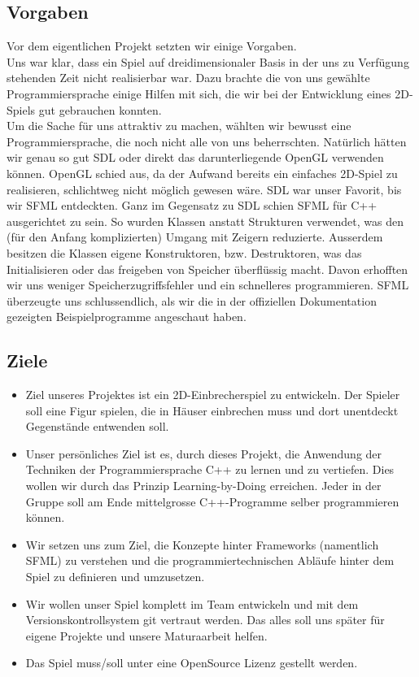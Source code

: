 \documentclass[12pt,a4paper]{scrartcl}
\begin{document}
\subsection{Vorgaben}

Vor dem eigentlichen Projekt setzten wir einige Vorgaben.
\\
Uns war klar, dass ein Spiel auf dreidimensionaler Basis in der uns zu Verfügung stehenden Zeit nicht realisierbar war.
Dazu brachte die von uns gewählte Programmiersprache einige Hilfen mit sich, die wir bei der Entwicklung eines 2D-Spiels gut gebrauchen konnten.
\\
Um die Sache für uns attraktiv zu machen,
wählten wir bewusst eine Programmiersprache, die noch nicht
alle von uns beherrschten. Natürlich hätten wir genau so gut
SDL oder direkt das darunterliegende OpenGL verwenden können. OpenGL
schied aus, da der Aufwand bereits ein einfaches 2D-Spiel zu realisieren,
schlichtweg nicht möglich gewesen wäre. SDL war unser Favorit, bis wir
SFML entdeckten. Ganz im Gegensatz zu SDL schien SFML für C++ ausgerichtet
zu sein. So wurden Klassen anstatt Strukturen verwendet, was den (für den
Anfang komplizierten) Umgang mit Zeigern reduzierte. Ausserdem besitzen die
Klassen eigene Konstruktoren, bzw. Destruktoren, was das Initialisieren
oder das freigeben von Speicher überflüssig macht. Davon erhofften wir uns
weniger Speicherzugriffsfehler und ein schnelleres programmieren. SFML
überzeugte uns schlussendlich, als wir die in der offiziellen Dokumentation
gezeigten Beispielprogramme angeschaut haben.

\subsection{Ziele}
\begin{itemize}
\item 
Ziel unseres Projektes ist ein 2D-Einbrecherspiel zu entwickeln. Der Spieler soll eine Figur spielen, die in Häuser einbrechen muss und dort unentdeckt Gegenstände entwenden soll.
\item
Unser persönliches Ziel ist es, durch dieses Projekt, die Anwendung der Techniken der
Programmiersprache C++ zu lernen und zu vertiefen. Dies wollen wir durch
das Prinzip Learning-by-Doing erreichen. Jeder in der Gruppe soll am Ende
mittelgrosse C++-Programme selber programmieren können.
\item
Wir setzen uns zum Ziel,
die Konzepte hinter Frameworks (namentlich SFML) zu verstehen und die
programmiertechnischen Abläufe hinter dem Spiel zu definieren und
umzusetzen.
\item
Wir wollen unser Spiel komplett im Team entwickeln und
mit dem Versionskontrollsystem git vertraut werden. Das alles soll uns später
für eigene Projekte und unsere Maturaarbeit helfen.
\item
Das Spiel muss/soll unter eine OpenSource Lizenz gestellt werden.
\end{itemize}
\end{document}
